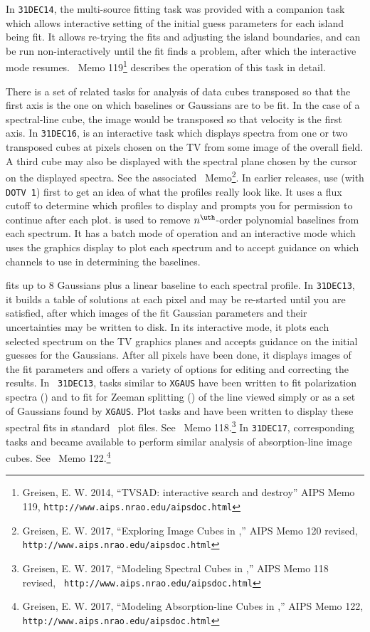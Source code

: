      In {\tt 31DEC14}, the multi-source fitting task {\tt {}}
was provided with a companion task {\tt {}} which allows
interactive setting of the initial guess parameters for each island
being fit.  It allows re-trying the fits and adjusting the island
boundaries, and can be run non-interactively until the fit finds a
problem, after which the interactive mode resumes.  \AIPS\ Memo
119\footnote{Greisen, E. W. 2014, ``TVSAD: interactive search and
destroy'' AIPS Memo 119, {\tt http://www.aips.nrao.edu/aipsdoc.html}}
describes the operation of this task in detail.

     There is a set of related tasks for analysis of data cubes
transposed so that the first axis is the one on which baselines or
Gaussians are to be fit.  In the case of a spectral-line cube, the
image would be transposed so that velocity is the first axis.
In {\tt 31DEC16}, {\tt {}} is an interactive task which
displays spectra from one or two transposed cubes at pixels chosen on
the TV from some image of the overall field.  A third cube may also be
displayed with the spectral plane chosen by the cursor on the
displayed spectra.  See the associated \AIPS\ Memo\footnote{Greisen,
E. W. 2017, ``Exploring Image Cubes in \AIPS,'' AIPS Memo 120 revised,
{\tt http://www.aips.nrao.edu/aipsdoc.html}}.  In earlier releases, use
{\tt {}} (with {\tt DOTV 1}) first to get an idea of what
the profiles really look like.  It uses a flux cutoff to determine
which profiles to display and prompts you for permission to continue
after each plot.  {\tt {}} is used to remove
$n^{\uth}$-order polynomial baselines from each spectrum.  It has a
batch mode of operation and an interactive mode which uses the
graphics display to plot each spectrum and to accept guidance on
which channels to use in determining the baselines.

{\tt {}} fits up to 8 Gaussians plus a linear baseline to
each spectral profile.  In {\tt 31DEC13}, it builds a table of
solutions at each pixel and may be re-started until you are satisfied,
after which images of the fit Gaussian parameters and their
uncertainties may be written to disk.  In its interactive mode, it
plots each selected spectrum on the TV graphics planes and accepts
guidance on the initial guesses for the Gaussians.  After all pixels
have been done, it displays images of the fit parameters and offers a
variety of options for editing and correcting the results.  In {\tt
31DEC13}, tasks similar to {\tt XGAUS} have been written to fit
polarization spectra ({\tt {}}) and to fit for Zeeman
splitting ({\tt {}}) of the line viewed simply or as a set
of Gaussians found by {\tt XGAUS}\@.  Plot tasks {\tt {}}
and {\tt {}} have been written to display these spectral
fits in standard \AIPS\ plot files.  See \AIPS\ Memo
118.\footnote{Greisen, E. W. 2017, ``Modeling Spectral Cubes in
\AIPS,'' AIPS Memo 118 revised, {\tt
http://www.aips.nrao.edu/aipsdoc.html}}  In {\tt 31DEC17},
corresponding tasks {\tt {}} and {\tt {}} became
available to perform similar analysis of absorption-line image cubes.
See \AIPS\ Memo 122.\footnote{Greisen, E. W. 2017, ``Modeling
Absorption-line Cubes in \AIPS,'' AIPS Memo 122, {\tt
http://www.aips.nrao.edu/aipsdoc.html}}

